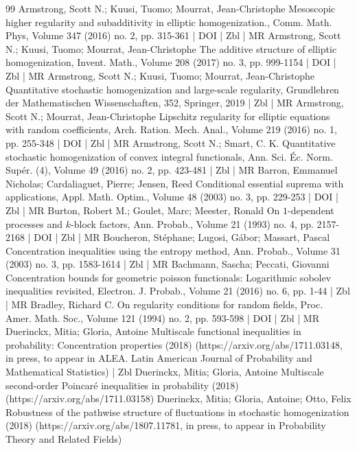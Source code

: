 \begin{thebibliography}{99}
Armstrong, Scott N.; Kuusi, Tuomo; Mourrat, Jean-Christophe Mesoscopic higher regularity and subadditivity in elliptic homogenization., Comm. Math. Phys, Volume 347 (2016) no. 2, pp. 315-361 | DOI | Zbl | MR
Armstrong, Scott N.; Kuusi, Tuomo; Mourrat, Jean-Christophe The additive structure of elliptic homogenization, Invent. Math., Volume 208 (2017) no. 3, pp. 999-1154 | DOI | Zbl | MR
Armstrong, Scott N.; Kuusi, Tuomo; Mourrat, Jean-Christophe Quantitative stochastic homogenization and large-scale regularity, Grundlehren der Mathematischen Wissenschaften, 352, Springer, 2019 | Zbl | MR
Armstrong, Scott N.; Mourrat, Jean-Christophe Lipschitz regularity for elliptic equations with random coefficients, Arch. Ration. Mech. Anal., Volume 219 (2016) no. 1, pp. 255-348 | DOI | Zbl | MR
Armstrong, Scott N.; Smart, C. K. Quantitative stochastic homogenization of convex integral functionals, Ann. Sci. Éc. Norm. Supér. (4), Volume 49 (2016) no. 2, pp. 423-481 | Zbl | MR
Barron, Emmanuel Nicholas; Cardaliaguet, Pierre; Jensen, Reed Conditional essential suprema with applications, Appl. Math. Optim., Volume 48 (2003) no. 3, pp. 229-253 | DOI | Zbl | MR
Burton, Robert M.; Goulet, Marc; Meester, Ronald On $1$-dependent processes and $k$-block factors, Ann. Probab., Volume 21 (1993) no. 4, pp. 2157-2168 | DOI | Zbl | MR
Boucheron, Stéphane; Lugosi, Gábor; Massart, Pascal Concentration inequalities using the entropy method, Ann. Probab., Volume 31 (2003) no. 3, pp. 1583-1614 | Zbl | MR
Bachmann, Sascha; Peccati, Giovanni Concentration bounds for geometric poisson functionals: Logarithmic sobolev inequalities revisited, Electron. J. Probab., Volume 21 (2016) no. 6, pp. 1-44 | Zbl | MR
Bradley, Richard C. On regularity conditions for random fields, Proc. Amer. Math. Soc., Volume 121 (1994) no. 2, pp. 593-598 | DOI | Zbl | MR
Duerinckx, Mitia; Gloria, Antoine Multiscale functional inequalities in probability: Concentration properties (2018) (https://arxiv.org/abs/1711.03148, in press, to appear in ALEA. Latin American Journal of Probability and Mathematical Statistics) | Zbl
Duerinckx, Mitia; Gloria, Antoine Multiscale second-order Poincaré inequalities in probability (2018) (https://arxiv.org/abs/1711.03158)
Duerinckx, Mitia; Gloria, Antoine; Otto, Felix Robustness of the pathwise structure of fluctuations in stochastic homogenization (2018) (https://arxiv.org/abs/1807.11781, in press, to appear in Probability Theory and Related Fields)

\end{thebibliography}
